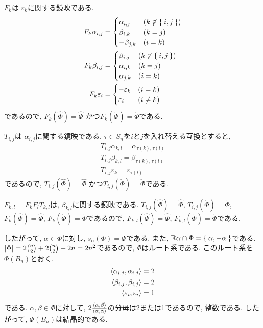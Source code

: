 $F_{k}$は
$\varepsilon_{k}$に関する鏡映である.
\begin{align*}
  F_{k}\alpha_{i,j}&=
  \begin{cases}
    \alpha_{i,j} & (k\not\in \Set{i,j})\\
    \beta_{i,k} & (k=j)\\
    -\beta_{j,k} & (i=k)\\
  \end{cases}
  \\
  F_k \beta_{i,j}&=
  \begin{cases}
    \beta_{i,j} & (k\not\in \Set{i,j})\\
    \alpha_{i,k} & (k=j)\\
    \alpha_{j,k} & (i=k)
  \end{cases}
  \\
  F_{k}\varepsilon_{i}&=
  \begin{cases}
    -\varepsilon_{k}&(i=k)\\
    \varepsilon_{i} &(i\neq k)
  \end{cases}
\end{align*}
であるので, 
$F_{k}(\hat\Phi)=\hat\Phi$
かつ$F_{k}(\check\Phi)=\check\Phi$である.

$T_{i,j}$は
$\alpha_{i,j}$に関する鏡映である.
$\tau\in S_n$を$i$と$j$を入れ替える互換とすると,
\begin{align*}
  T_{i,j}\alpha_{k,l}=\alpha_{\tau(k),\tau(l)}\\
  T_{i,j}\beta_{k,l}=\beta_{\tau(k),\tau(l)}\\
  T_{i,j}\varepsilon_{k}=\varepsilon_{\tau(l)}
\end{align*}
であるので,
$T_{i,j}(\hat\Phi)=\hat\Phi$
かつ$T_{i,j}(\check\Phi)=\check\Phi$である.


$F_{k,l}=F_kF_lT_{k,l}$は, $\beta_{k,l}$に関する鏡映である.
$T_{i,j}(\hat\Phi)=\hat\Phi$,
$T_{i,j}(\check\Phi)=\check\Phi$,
$F_{k}(\hat\Phi)=\hat\Phi$,
$F_{k}(\check\Phi)=\check\Phi$であるので,
$F_{k,l}(\hat\Phi)=\hat\Phi$,
$F_{k,l}(\check\Phi)=\check\Phi$である.

したがって, $\alpha\in \Phi$に対し,
$s_{\alpha}(\Phi)=\Phi$である.
また,
$\mathbb{R}\alpha\cap\Phi=\Set{\alpha,-\alpha}$である.
$\left|\Phi\right|=2\binom{n}{2}+2\binom{n}{2}+2n=2n^2$であるので,
$\Phi$はルート系である.
このルート系を$\Phi(B_{n})$とおく.
\begin{align*}
  \Braket{\alpha_{i,j},\alpha_{i,j}}&=2\\
  \Braket{\beta_{i,j},\beta_{i,j}}&=2\\
  \Braket{\varepsilon_{i},\varepsilon_{i}}&=1
\end{align*}
である.
$\alpha,\beta\in\Phi$に対して,
$2\frac{\Braket{\alpha,\beta}}{\Braket{\alpha,\alpha}}$の分母は2または1であるので, 整数である.
したがって,
$\Phi(B_{n})$は結晶的である.

